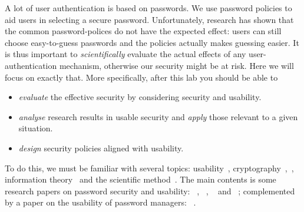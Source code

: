 A lot of user authentication is based on passwords.
We use password policies to aid users in selecting a secure password.
Unfortunately, research has shown that the common password-polices do not have 
the expected effect: users can still choose easy-to-guess passwords and the 
policies actually makes guessing easier.
It is thus important to \emph{scientifically} evaluate the actual effects of 
any user-authentication mechanism, otherwise our security might be at risk.
Here we will focus on exactly that.
More specifically, after this lab you should be able to
\begin{itemize}
  \item \emph{evaluate} the effective security by considering security and 
    usability.
  \item \emph{analyse} research results in usable security and \emph{apply} 
    those relevant to a given situation.
  \item \emph{design} security policies aligned with usability.
\end{itemize}

To do this, we must be familiar with several topics: 
usability~\cite[Ch.~2]{Anderson2008sea}, 
cryptography~,\cite[Ch.~5]{Anderson2008sea}~\cite{BoskHighLevelCrypto},  
information theory~\cite{Ueltschi2013se} and the scientific 
method~\cite{ComputerSecurityExperiments}.
The main contents is some research papers on password security and usability:
~\cite{GuessAgainAndAgain},
~\cite{OfPasswordsAndPeople}, 
~\cite{CanLongPasswordsBeSecureAndUsable} 
and
~\cite{PasswordLifeCycle};
complemented by a paper on the usability of password managers:
~\cite{UsabilityEvaluationOfPasswordManagers}.
